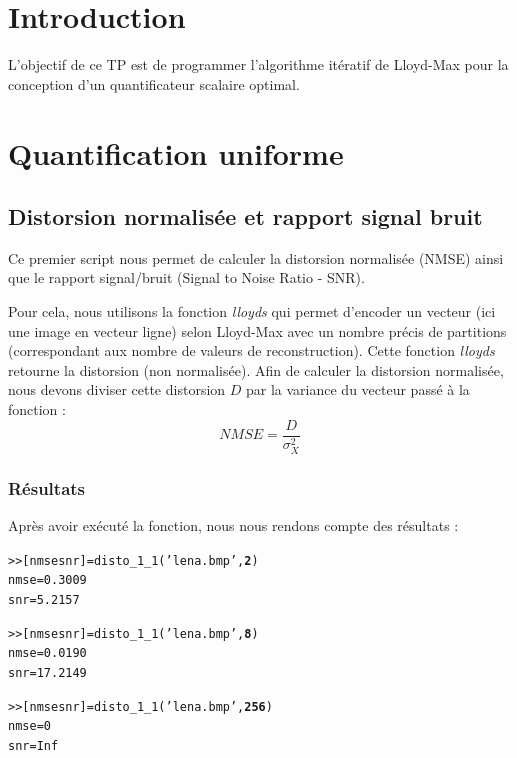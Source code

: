 \documentclass[a4paper, 12pt]{article}
\begin{document}






\clearpage

\section{Introduction}
L'objectif de ce TP est de programmer l'algorithme itératif de Lloyd-Max pour la conception d'un quantificateur scalaire optimal.

\section{Quantification uniforme}

\subsection{Distorsion normalisée et rapport signal bruit}

Ce premier script nous permet de calculer la distorsion normalisée (NMSE) ainsi que le rapport signal/bruit (Signal to Noise Ratio - SNR).

Pour cela, nous utilisons la fonction \textit{lloyds} qui permet d'encoder un vecteur (ici une image en vecteur ligne) selon Lloyd-Max avec un nombre précis de partitions (correspondant aux nombre de valeurs de reconstruction). Cette fonction \textit{lloyds} retourne la distorsion (non normalisée). Afin de calculer la distorsion normalisée, nous devons diviser cette distorsion $D$ par la variance du vecteur passé à la fonction :
		\[NMSE = \frac{D}{\sigma_X^2} 
	\]


\subsubsection{R\'esultats}
\label{sec:Resultats}

Après avoir exécuté la fonction, nous nous rendons compte des résultats : 

\begin{alltt}
>> [nmse snr] = disto_1_1('lena.bmp', \textbf{2})
nmse = 0.3009
snr = 5.2157

>> [nmse snr] = disto_1_1('lena.bmp', \textbf{8})
nmse = 0.0190
snr = 17.2149

>> [nmse snr] = disto_1_1('lena.bmp', \textbf{256})
nmse = 0
snr = Inf
\end{alltt}
\end{document}

